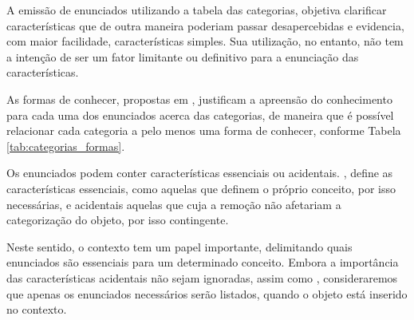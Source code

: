 A emissão de enunciados utilizando a tabela das categorias, objetiva clarificar características que de outra maneira poderiam passar desapercebidas e evidencia, com maior facilidade, características simples. Sua utilização, no entanto, não tem a intenção de ser um fator limitante ou definitivo para a enunciação das características.

As formas de conhecer, propostas em \citep{rosch:1999.principles}, justificam a apreensão do conhecimento para cada uma dos enunciados acerca das categorias, de maneira que é possível relacionar cada categoria a pelo menos uma forma de conhecer, conforme Tabela \ref{tab:categorias_formas}. 

\begin{table}
\centering
{}
\caption{Modos de Percepção do mundo x Categorias Aristotélicas. Fonte: autor.}
\label{tab:categorias_formas}
\end{table}

Os enunciados podem conter características essenciais ou acidentais. \citet{dahlberg:1978.teoria}, define as características essenciais, como aquelas que definem o próprio conceito, por isso necessárias, e acidentais aquelas que cuja a remoção não afetariam a categorização do objeto, por isso contingente.

Neste sentido, o contexto tem um papel importante, delimitando quais enunciados são essenciais para um determinado conceito. Embora a importância das características acidentais não sejam ignoradas, assim como \citet{medrado:2008.espelho}, consideraremos que apenas os enunciados necessários serão listados, quando o objeto está inserido no contexto.

